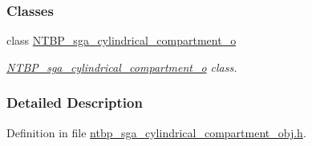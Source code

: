 \subsubsection*{Classes}
\begin{DoxyCompactItemize}
\item 
class \hyperlink{class_n_t_b_p__sga__cylindrical__compartment__o}{NTBP\_\-sga\_\-cylindrical\_\-compartment\_\-o}
\begin{DoxyCompactList}\small\item\em \hyperlink{class_n_t_b_p__sga__cylindrical__compartment__o}{NTBP\_\-sga\_\-cylindrical\_\-compartment\_\-o} class. \item\end{DoxyCompactList}\end{DoxyCompactItemize}


\subsubsection{Detailed Description}


Definition in file \hyperlink{ntbp__sga__cylindrical__compartment__obj_8h_source}{ntbp\_\-sga\_\-cylindrical\_\-compartment\_\-obj.h}.

